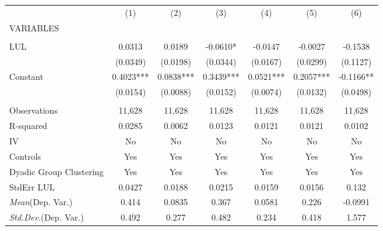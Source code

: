 \documentclass[]{article}
\begin{document}
\begin{tabular}{lcccccc} \hline
 & (1) & (2) & (3) & (4) & (5) & (6) \\
VARIABLES &  &  &  &  &  &  \\ \hline
 &  &  &  &  &  &  \\
LUL & 0.0313 & 0.0189 & -0.0610* & -0.0147 & -0.0027 & -0.1538 \\
 & (0.0349) & (0.0198) & (0.0344) & (0.0167) & (0.0299) & (0.1127) \\
Constant & 0.4023*** & 0.0838*** & 0.3439*** & 0.0521*** & 0.2057*** & -0.1166** \\
 & (0.0154) & (0.0088) & (0.0152) & (0.0074) & (0.0132) & (0.0498) \\
 &  &  &  &  &  &  \\
Observations & 11,628 & 11,628 & 11,628 & 11,628 & 11,628 & 11,628 \\
R-squared & 0.0285 & 0.0062 & 0.0123 & 0.0121 & 0.0121 & 0.0102 \\
IV & No & No & No & No & No & No \\
Controls & Yes & Yes & Yes & Yes & Yes & Yes \\
Dyadic Group Clustering & Yes & Yes & Yes & Yes & Yes & Yes \\
StdErr LUL & 0.0427 & 0.0188 & 0.0215 & 0.0159 & 0.0156 & 0.132 \\
\textit{Mean}(Dep. Var.) & 0.414 & 0.0835 & 0.367 & 0.0581 & 0.226 & -0.0991 \\
 \textit{Std.Dev.}(Dep. Var.) & 0.492 & 0.277 & 0.482 & 0.234 & 0.418 & 1.577 \\ \hline
\end{tabular}
\end{document}
